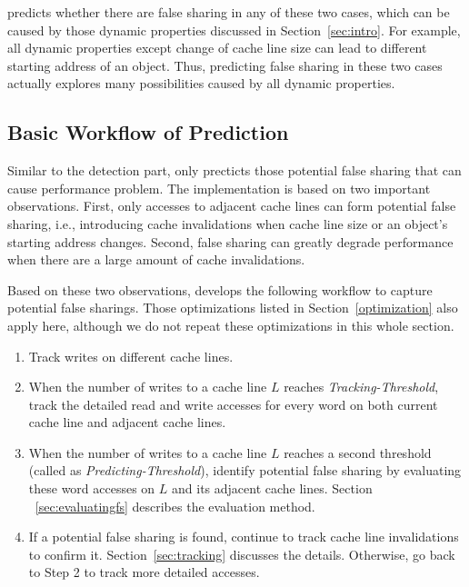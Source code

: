 \Predator{} predicts whether there are false sharing 
in any of these two cases, which can
be caused by those dynamic properties discussed in Section~\ref{sec:intro}.
For example, all dynamic properties except change of cache line size 
can lead to different starting address of an object. 
Thus, predicting false sharing in these two cases actually 
explores many possibilities caused by all dynamic properties.

\subsection{Basic Workflow of Prediction}
\label{sec:predictionmechanism} 

Similar to the detection part, 
\Predator{} only precticts those potential false sharing that can 
cause performance problem.
The implementation is based on
two important observations. First, only accesses to 
adjacent cache lines can form potential false sharing, 
i.e., introducing cache invalidations when cache line size
or an object's starting address changes.
Second, false sharing can greatly degrade performance when 
there are a large amount of cache invalidations.

Based on these two observations, \Predator{} develops 
the following workflow to capture potential false sharings.
Those optimizations listed in Section~\ref{optimization} also apply
here, although we do not repeat these optimizations in
this whole section.

\begin{enumerate}
\item
Track writes on different cache lines. 

\item
When the number of writes to a cache line $L$ reaches {\it Tracking-Threshold},
track the detailed read and write accesses for every word on both current cache line 
and adjacent cache lines. 

\item
When the number of writes to a cache line $L$ reaches a second threshold (called as
{\it Predicting-Threshold}), 
identify potential false sharing by evaluating these word accesses on $L$ and 
its adjacent cache lines. Section ~\ref{sec:evaluatingfs} describes the evaluation method.

\item
If a potential false sharing is found, continue to track cache line invalidations
to confirm it. Section~\ref{sec:tracking} discusses the details.
Otherwise, go back to Step 2 to track more detailed accesses.
 
\end{enumerate}

